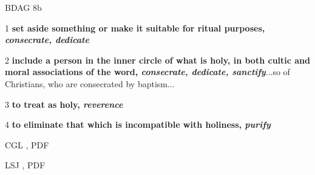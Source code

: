 				\begin{compactdesc}
					\item[BDAG 8b] \textbf{}
						\begin{compactitem}
							\item[1] \textbf{set aside something or make it suitable for ritual purposes, \textit{consecrate, dedicate}}
							\item[2] \textbf{include a person in the inner circle of what is holy, in both cultic and moral associations of the word, \textit{consecrate, dedicate, sanctify}}...so of Christians, who are consecrated by baptism...
							\item[3] \textbf{to treat as holy, \textit{reverence}}
							\item[4] \textbf{to eliminate that which is incompatible with holiness, \textit{purify}}
						\end{compactitem}
					\item[CGL , PDF ] \textbf{}
						\begin{compactitem}
							\item 
						\end{compactitem}
					\item[LSJ , PDF ] \textbf{}
						\begin{compactitem}
							\item 
						\end{compactitem}
				\end{compactdesc}
				
				
				
				
			\subparagraph{\texorpdfstring{}{}}
				\label{HAGIASMOS}
			
